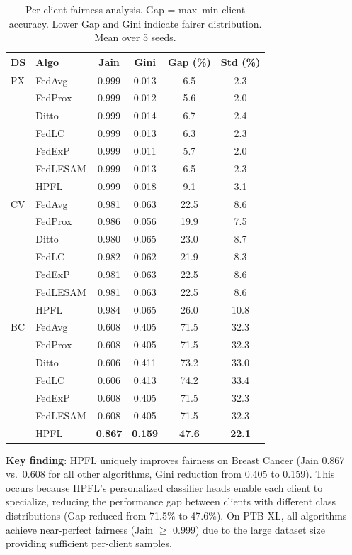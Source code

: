 \documentclass[conference,a4paper]{IEEEtran}
\begin{document}
\begin{table}[t]
\centering
\caption{Per-client fairness analysis. Gap = max--min client accuracy. Lower Gap and Gini indicate fairer distribution. Mean over 5 seeds.}
\label{tab:fairness_detail}
\footnotesize
\begin{tabular}{ll cccc}
\toprule
\textbf{DS} & \textbf{Algo} & \textbf{Jain} & \textbf{Gini} & \textbf{Gap (\%)} & \textbf{Std (\%)} \\
\midrule
PX & FedAvg & 0.999 & 0.013 & 6.5 & 2.3 \\
 & FedProx & 0.999 & 0.012 & 5.6 & 2.0 \\
 & Ditto & 0.999 & 0.014 & 6.7 & 2.4 \\
 & FedLC & 0.999 & 0.013 & 6.3 & 2.3 \\
 & FedExP & 0.999 & 0.011 & 5.7 & 2.0 \\
 & FedLESAM & 0.999 & 0.013 & 6.5 & 2.3 \\
 & HPFL & 0.999 & 0.018 & 9.1 & 3.1 \\
\midrule
CV & FedAvg & 0.981 & 0.063 & 22.5 & 8.6 \\
 & FedProx & 0.986 & 0.056 & 19.9 & 7.5 \\
 & Ditto & 0.980 & 0.065 & 23.0 & 8.7 \\
 & FedLC & 0.982 & 0.062 & 21.9 & 8.3 \\
 & FedExP & 0.981 & 0.063 & 22.5 & 8.6 \\
 & FedLESAM & 0.981 & 0.063 & 22.5 & 8.6 \\
 & HPFL & 0.984 & 0.065 & 26.0 & 10.8 \\
\midrule
BC & FedAvg & 0.608 & 0.405 & 71.5 & 32.3 \\
 & FedProx & 0.608 & 0.405 & 71.5 & 32.3 \\
 & Ditto & 0.606 & 0.411 & 73.2 & 33.0 \\
 & FedLC & 0.606 & 0.413 & 74.2 & 33.4 \\
 & FedExP & 0.608 & 0.405 & 71.5 & 32.3 \\
 & FedLESAM & 0.608 & 0.405 & 71.5 & 32.3 \\
 & HPFL & \textbf{0.867} & \textbf{0.159} & \textbf{47.6} & \textbf{22.1} \\
\bottomrule
\end{tabular}
\end{table}

\textbf{Key finding}: HPFL uniquely improves fairness on Breast Cancer (Jain 0.867 vs.\ 0.608 for all other algorithms, Gini reduction from 0.405 to 0.159). This occurs because HPFL's personalized classifier heads enable each client to specialize, reducing the performance gap between clients with different class distributions (Gap reduced from 71.5\% to 47.6\%). On PTB-XL, all algorithms achieve near-perfect fairness (Jain $\geq$ 0.999) due to the large dataset size providing sufficient per-client samples.
\end{document}
